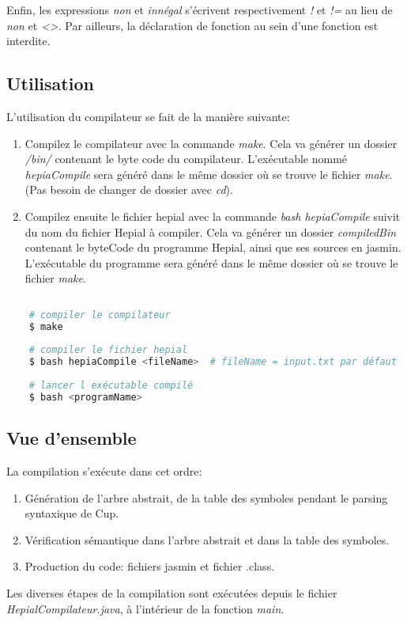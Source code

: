\documentclass[11pt,a4paper]{article}
\begin{document}
     \par Enfin, les expressions \textit{non} et \textit{innégal} s'écrivent respectivement \textit{!} et \textit{!=} au lieu de \textit{non} et \textit{<>}. Par ailleurs, la déclaration de fonction au sein d'une fonction est interdite.
     
  \subsection{Utilisation}
  
  \par L'utilisation du compilateur se fait de la manière suivante: 

  \begin{enumerate}
  \item Compilez le compilateur avec la commande \textit{make}. Cela va générer un dossier \textit{/bin/} contenant le byte code du compilateur. L'exécutable nommé \textit{hepiaCompile} sera généré dans le même dossier où se trouve le fichier \textit{make}. (Pas besoin de changer de dossier avec \textit{cd}).  
  \item Compilez ensuite le fichier hepial avec la commande \textit{bash hepiaCompile} suivit du nom du fichier Hepial à compiler. Cela va générer un dossier \textit{compiledBin} contenant le byteCode du programme Hepial, ainsi que ses sources en jasmin. L’exécutable du programme sera généré dans le même dossier où se trouve le fichier \textit{make}.
  \end{enumerate}
  
  \begin{lstlisting}[language=bash,caption={Utilisation du compilateur}]
    
    # compiler le compilateur
    $ make 
    
    # compiler le fichier hepial
    $ bash hepiaCompile <fileName>  # fileName = input.txt par défaut
    
    # lancer l exécutable compilé
    $ bash <programName>
  \end{lstlisting}

\newpage  
  
  \subsection{Vue d'ensemble}
  
  \par La compilation s'exécute dans cet ordre:
  \begin{enumerate}
    \item Génération de l'arbre abstrait, de la table des symboles pendant le parsing syntaxique de Cup. 
    \item Vérification sémantique dans l'arbre abstrait et dans la table des symboles. 
    \item Production du code: fichiers jasmin et fichier .class. 
  \end{enumerate}
  
  \par  Les diverses étapes de la compilation sont exécutées depuis le fichier \textit{HepialCompilateur.java}, à l'intérieur de la fonction \textit{main}.
  
  

   
   
\end{document}

